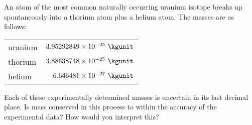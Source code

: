         An atom of the most common naturally occurring uranium isotope breaks up spontaneously
        into a thorium atom plus a helium atom. The masses are as follows:

        \begin{tabular}{lr}
                uranium        & $3.95292849\times 10^{-25}\ \kgunit$ \\
                thorium & $3.88638748\times 10^{-25}\ \kgunit$ \\
                helium & $6.646481\times 10^{-27}\ \kgunit$ \\
        \end{tabular}

        \noindent{}Each of these experimentally determined masses is uncertain in its last decimal
        place. Is mass conserved in this process to within the accuracy of the experimental
        data? How would you interpret this?
